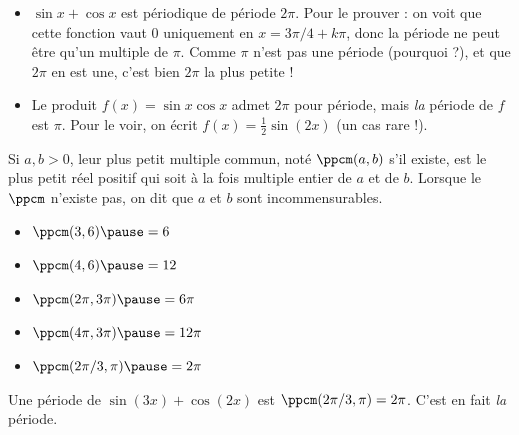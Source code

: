 \begin{frame}%
  \begin{example}
    \begin{itemize}\pause
    \item \(\sin x + \cos x\) est périodique de période \(2\pi\).\pause{} Pour le prouver : on voit que cette fonction vaut \(0\) uniquement en \(x = 3\pi/4 + k \pi\)\pause, donc la période ne peut être qu'un multiple de \(\pi\).\pause{} Comme \(\pi\) n'est pas une période (pourquoi ?),\pause{} et que \(2\pi\) en est une,\pause{} c'est bien \(2\pi\) la plus petite !\pause{}
    \item Le produit \(f(x) = \sin x \cos x\) admet \(2\pi\) pour période, mais \emph{la} période de \(f\) est \(\pi\).\pause{} Pour le voir, on écrit \(f(x) = \frac{1}{2}\sin(2x)\) (un cas rare !).
    \end{itemize}
  \end{example}
\end{frame}
\begin{frame}
    \begin{definition}
      Si \(a, b > 0\), leur \og plus petit multiple commun\fg{}, noté \(\ppcm(a,b)\) s'il existe\pause, est le plus petit réel positif qui soit à la fois multiple entier de \(a\) et de \(b\).\pause{} Lorsque le \(\ppcm\) n'existe pas, on dit que \(a\) et \(b\) sont incommensurables.
  \end{definition}\pause
  \begin{example}%
    \begin{itemize}
    \item \(\ppcm(3,6)\pause = 6\)\pause
    \item \(\ppcm(4,6)\pause = 12\)\pause
    \item \(\ppcm(2\pi,3\pi)\pause = 6\pi\)\pause
    \item \(\ppcm(4\pi,3\pi)\pause = 12\pi\)\pause
    \item \(\ppcm(2\pi/3,\pi)\pause = 2\pi\)
  \end{itemize}
  \end{example}\pause
  \begin{example}
    Une période de \(\sin(3x) + \cos(2x)\) est \(\ppcm(2\pi/3, \pi) = 2\pi\).\pause{} C'est en fait \emph{la} période.
  \end{example}
\end{frame}

